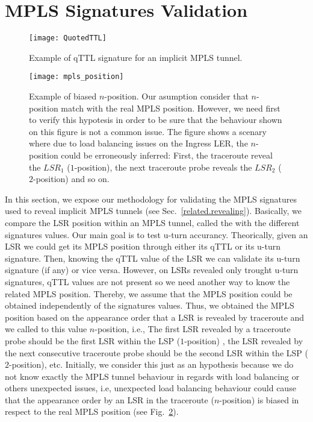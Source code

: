 \section{MPLS Signatures Validation}\label{validation}
\begin{figure}[!t]
  \begin{center}
    \texttt{[image: QuotedTTL]}
  \end{center}
  \caption{Example of qTTL signature for an implicit MPLS tunnel.}
  \label{validation.qTTLFig}
\end{figure}

\begin{figure}[!t]
  \begin{center}
    \texttt{[image: mpls\_position]}
  \end{center}
  \caption{Example of biased $n$-position. Our asumption consider that $n$-position match with the real MPLS position. However, we need first to verify this hypotesis in order to be sure that the behaviour shown on this figure is not a common issue. The figure shows a scenary where due to load balancing issues on the Ingress LER, the $n$-position could be erroneously inferred: First, the traceroute reveal the $LSR_{1}$ ($1$-position), the next traceroute probe reveals the $LSR_{2}$ ($2$-position) and so on.}
  \label{validation.MPLSpositionFig}
\end{figure}

In this section, we expose our methodology for validating the MPLS
signatures used to reveal implicit MPLS tunnels (see Sec.~\ref{related.revealing}).
Basically, we compare the LSR position within an MPLS tunnel, called the
 with the different signatures values. Our main goal is to test 
u-turn accurancy. Theorically, given an LSR we could get its MPLS position through 
either its qTTL or its u-turn signature. Then, knowing the qTTL value of the LSR we 
can validate its u-turn signature (if any) or vice versa. However, on LSRs revealed 
only trought u-turn signatures,
qTTL values are not present so we need another way to know the related MPLS position. 
Thereby, we assume that the MPLS position
could be obtained independently of the signatures values. 
Thus, we obtained the MPLS position based on the appearance order that a LSR is 
revealed by traceroute and we called to this value $n$-position, i.e., 
The first LSR revealed by a traceroute probe should be
the first LSR within the LSP ($1$-position) , the LSR revealed by the next 
consecutive traceroute probe should be
the second LSR within the LSP ($2$-position), etc. Initially, we consider 
this just as an hypothesis because we do not know 
exactly the MPLS tunnel behaviour in regards with load balancing or others 
unexpected issues, i.e, unexpected load balancing behaviour could cause 
that the appearance order by an LSR in the traceroute ($n$-position) 
is biased in respect to the real MPLS position (see Fig.~\ref{validation.MPLSpositionFig}).

